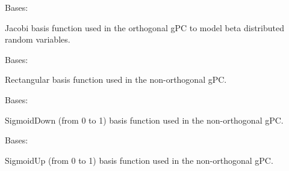 \documentclass[letterpaper,10pt,english,openany,oneside]{sphinxmanual}
\begin{document}

\begin{fulllineitems}
\label{\detokenize{pygpc:pygpc.BasisFunction.Jacobi}}
Bases: {\hyperref[\detokenize{pygpc:pygpc.BasisFunction.BasisFunction}]{}}

Jacobi basis function used in the orthogonal gPC to model beta distributed random variables.

\end{fulllineitems}


\begin{fulllineitems}
\label{\detokenize{pygpc:pygpc.BasisFunction.Rect}}
Bases: {\hyperref[\detokenize{pygpc:pygpc.BasisFunction.BasisFunction}]{}}

Rectangular basis function used in the non-orthogonal gPC.

\end{fulllineitems}


\begin{fulllineitems}
\label{\detokenize{pygpc:pygpc.BasisFunction.SigmoidDown}}
Bases: {\hyperref[\detokenize{pygpc:pygpc.BasisFunction.BasisFunction}]{}}

SigmoidDown (from 0 to 1) basis function used in the non-orthogonal gPC.

\end{fulllineitems}


\begin{fulllineitems}
\label{\detokenize{pygpc:pygpc.BasisFunction.SigmoidUp}}
Bases: {\hyperref[\detokenize{pygpc:pygpc.BasisFunction.BasisFunction}]{}}

SigmoidUp (from 0 to 1) basis function used in the non-orthogonal gPC.

\end{fulllineitems}
\end{document}
